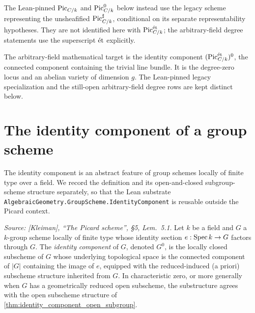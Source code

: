 The Lean-pinned \(\operatorname{Pic}_{C/k}\) and \(\operatorname{Pic}^0_{C/k}\) below instead use the
legacy scheme representing the unsheafified \(\operatorname{Pic}^\sharp_{C/k}\), conditional
on its separate representability hypotheses. They are not identified here
with \(\operatorname{Pic}^{\mathrm{\acute{e}t}}_{C/k}\); the arbitrary-field degree statements use the
superscript \(\mathrm{\acute{e}t}\) explicitly.

The arbitrary-field mathematical target is the identity component
\((\operatorname{Pic}^{\mathrm{\acute{e}t}}_{C/k})^0\), the connected component containing the trivial line
bundle. It is the degree-zero locus and an abelian variety of dimension \(g\).
The Lean-pinned legacy specialization and the still-open arbitrary-field degree
rows are kept distinct below.

\section{The identity component of a group scheme}
\label{sec:identity_component_abstract}

The identity component is an abstract feature of group schemes locally
of finite type over a field. We record the definition and its
open-and-closed subgroup-scheme structure separately, so that the
Lean substrate
\texttt{AlgebraicGeometry.GroupScheme.IdentityComponent} is reusable
outside the Picard context.

\begin{definition}\leanok
  \label{def:identity_component_group_scheme}
  \textit{Source: [Kleiman], ``The Picard scheme'', \S 5, Lem.~5.1.}
  Let \(k\) be a field and \(G\) a \(k\)-group scheme locally of finite type
  whose identity section \(e : \operatorname{Spec} k \to G\) factors through \(G\). The
  \emph{identity component} of \(G\), denoted \(G^0\), is the locally closed
  subscheme of \(G\) whose underlying topological space is the connected
  component of \(|G|\) containing the image of \(e\), equipped with the
  reduced-induced (a priori) subscheme structure inherited from \(G\).
  In characteristic zero, or more generally when \(G\) has a
  geometrically reduced open subscheme, the substructure agrees with
  the open subscheme structure of \cref{thm:identity_component_open_subgroup}.
\end{definition}

